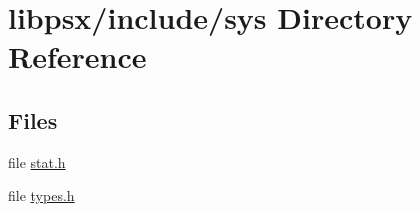 \hypertarget{dir_000010}{}\section{libpsx/include/sys Directory Reference}
\label{dir_000010}
\subsection*{Files}
\begin{DoxyCompactItemize}
\item 
file \hyperlink{stat_8h}{stat.\+h}
\item 
file \hyperlink{sys_2types_8h}{types.\+h}
\end{DoxyCompactItemize}
